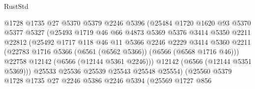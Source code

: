 \begin{lexlean}{RustStd}
\begin{coremodule}
{\begin{coremodule}
{{{{{{{{{{{{{{{{{{{{{{{{{{                              @1728
                              @1735
                              @27
                              @5370
                              @5379
                              @2246
                              @5396
                              (@25484
                                @1720
                                @1620
                                @93
                                @5370
                                @5377
                                @5327
                                (@25493
                                  @1719
                                  @46
                                  @66
                                  @4873
                                  @5369
                                  @5376
                                  @3414
                                  @5350
                                  @2211
                                  @22812
                                  (@25492
                                    @1717
                                    @118
                                    @46
                                    @11
                                    @5366
                                    @2246
                                    @2229
                                    @3414
                                    @5360
                                    @2211
                                    (@22783
                                      @1716
                                      @5366
                                      (@6561 (@6562 @5366))
                                      (@6566 (@6568 @1716 @46)))
                                    @22758
                                    @12142
                                    (@6566 (@12144 @5361 @2246)))
                                  @12142
                                  (@6566 (@12144 @5351 @5369)))
                                @25533
                                @25536
                                @25539
                                @25543
                                @25548
                                @25554)
                              (@25560
                                @5379
                                @1728
                                @1735
                                @27
                                @2246
                                @5386
                                @2246
                                @5394
                                (@25569
                                  @1727
                                  @856
}}}}}}}}}}}}}}}}}}}}}}}}}}
\end{coremodule}}
\end{coremodule}
\end{lexlean}
